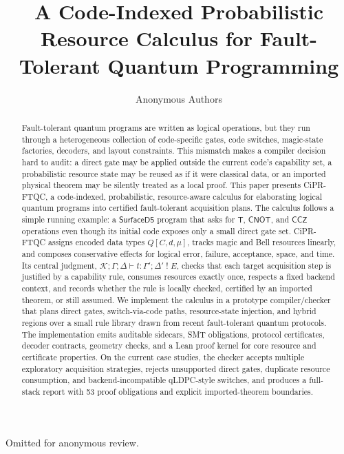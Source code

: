 \documentclass[acmsmall,screen,review,anonymous]{acmart}
\title[Code-Indexed Resource Calculus for FTQC]{A Code-Indexed Probabilistic Resource Calculus for Fault-Tolerant Quantum Programming}
\author{Anonymous Authors}
\affiliation{\institution{Anonymous Institution}\country{}}
\newcommand{\system}{CiPR-FTQC\xspace}
\newcommand{\judgment}{\mathcal{K};\Gamma;\Delta \vdash t : \Gamma';\Delta' \;!\; E}
\newcommand{\code}[1]{\ensuremath{\mathsf{#1}}}
\newcommand{\gate}[1]{\ensuremath{\mathsf{#1}}}
\begin{document}
\begin{abstract}
Fault-tolerant quantum programs are written as logical operations, but they run through a heterogeneous collection of code-specific gates, code switches, magic-state factories, decoders, and layout constraints.
This mismatch makes a compiler decision hard to audit: a direct gate may be applied outside the current code's capability set, a probabilistic resource state may be reused as if it were classical data, or an imported physical theorem may be silently treated as a local proof.
This paper presents \system, a code-indexed, probabilistic, resource-aware calculus for elaborating logical quantum programs into certified fault-tolerant acquisition plans.
The calculus follows a simple running example: a \code{SurfaceD5} program that asks for $\gate{T}$, $\gate{CNOT}$, and $\gate{CCZ}$ operations even though its initial code exposes only a small direct gate set.
\system assigns encoded data types $Q[C,d,\mu]$, tracks magic and Bell resources linearly, and composes conservative effects for logical error, failure, acceptance, space, and time.
Its central judgment, $\judgment$, checks that each target acquisition step is justified by a capability rule, consumes resources exactly once, respects a fixed backend context, and records whether the rule is locally checked, certified by an imported theorem, or still assumed.
We implement the calculus in a prototype compiler/checker that plans direct gates, switch-via-code paths, resource-state injection, and hybrid regions over a small rule library drawn from recent fault-tolerant quantum protocols.
The implementation emits auditable sidecars, SMT obligations, protocol certificates, decoder contracts, geometry checks, and a Lean proof kernel for core resource and certificate properties.
On the current case studies, the checker accepts multiple exploratory acquisition strategies, rejects unsupported direct gates, duplicate resource consumption, and backend-incompatible qLDPC-style switches, and produces a full-stack report with 53 proof obligations and explicit imported-theorem boundaries.
\end{abstract}

\maketitle












\begin{acks}
Omitted for anonymous review.
\end{acks}




\appendix

\end{document}

